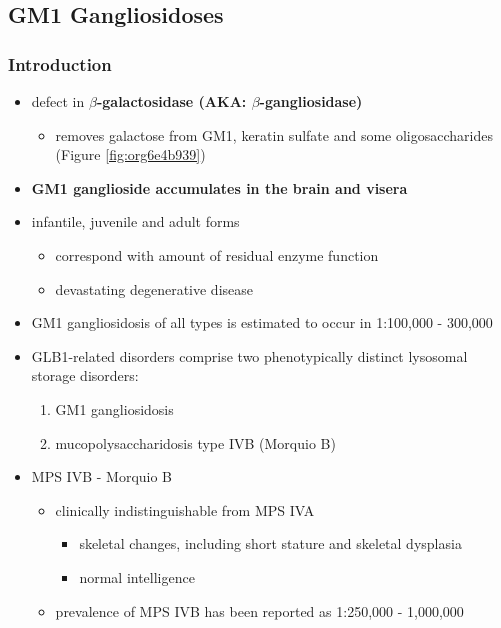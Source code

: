 \documentclass[12pt]{scrartcl}
\begin{document}
\subsection{GM1 Gangliosidoses}
\label{sec:orgc8b85db}
\subsubsection{Introduction}
\label{sec:org8bafd6e}
\begin{itemize}
\item defect in \textbf{\(\beta\)-galactosidase (AKA: \(\beta\)-gangliosidase)}
\begin{itemize}
\item removes galactose from GM1, keratin sulfate and some oligosaccharides (Figure \ref{fig:org6e4b939})
\end{itemize}
\item \textbf{GM1 ganglioside accumulates in the brain and visera}
\item infantile, juvenile and adult forms
\begin{itemize}
\item correspond with amount of residual enzyme function
\item devastating degenerative disease
\end{itemize}
\item GM1 gangliosidosis of all types is estimated to occur in 1:100,000 - 300,000
\item GLB1-related disorders comprise two phenotypically distinct lysosomal storage disorders:
\begin{enumerate}
\item GM1 gangliosidosis
\item mucopolysaccharidosis type IVB (Morquio B)
\end{enumerate}
\item MPS IVB - Morquio B
\begin{itemize}
\item clinically indistinguishable from MPS IVA 
\begin{itemize}
\item skeletal changes, including short stature and skeletal dysplasia
\item normal intelligence
\end{itemize}
\item prevalence of MPS IVB has been reported as 1:250,000 - 1,000,000
\end{itemize}
\end{itemize}
\end{document}
